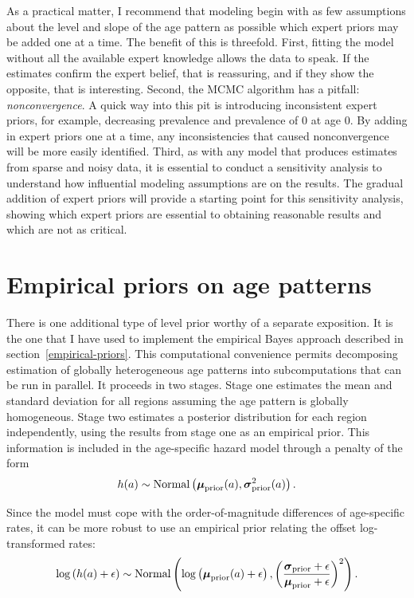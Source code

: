 As a practical matter, I recommend that modeling begin with as few
assumptions about the level and slope of the age pattern as possible
which expert priors may be added one at a time. The
benefit of this is threefold.  First, fitting the model without all
the available expert knowledge allows the data to speak.  If the estimates
confirm the expert belief, that is reassuring, and if they show the
opposite, that is interesting. Second, the MCMC algorithm has a
pitfall: \emph{nonconvergence}. A quick way into this pit is
introducing inconsistent expert priors, for example, decreasing
prevalence and prevalence of $0$ at age $0$. By adding in expert
priors one at a time, any inconsistencies that caused nonconvergence
will be more easily identified. Third, as with any model that produces
estimates from sparse and noisy data, it is essential to conduct a
sensitivity analysis to understand how influential modeling
assumptions are on the results.  The gradual addition of expert priors
will provide a starting point for this sensitivity analysis, showing
which expert priors are essential to obtaining reasonable results and
which are not as critical.

\section{Empirical priors on age patterns}
There is one additional type of level prior worthy of a separate
exposition. It is the one that I have used to implement the empirical
Bayes approach described in section~\ref{empirical-priors}.  This
computational convenience permits decomposing estimation of globally
heterogeneous age patterns into subcomputations that can be run in
parallel.  It proceeds in two stages.  Stage one estimates the mean
and standard deviation for all regions assuming the age pattern is
globally homogeneous.  Stage two estimates a posterior distribution
for each region independently, using the results from stage one as an
empirical prior.  This information is included in the age-specific
hazard model through a penalty of the form
\[
h(a) \sim \operatorname{Normal}\left(\boldsymbol{\mu}_{\text{prior}}(a),
\boldsymbol{\sigma}_{\text{prior}}^2(a)\right).
\]

Since the model must cope with the order-of-magnitude differences of age-specific rates, it can be more robust to use an empirical prior relating the offset log-transformed rates:
\[
\log\left(h(a)+\epsilon\right) \sim \operatorname{Normal}\left(\log\left(\boldsymbol{\mu}_{\text{prior}}(a)+\epsilon\right),
\left(\frac{\boldsymbol{\sigma}_{\text{prior}}+\epsilon}{\boldsymbol{\mu}_{\text{prior}}+\epsilon}\right)^2\right).
\]

